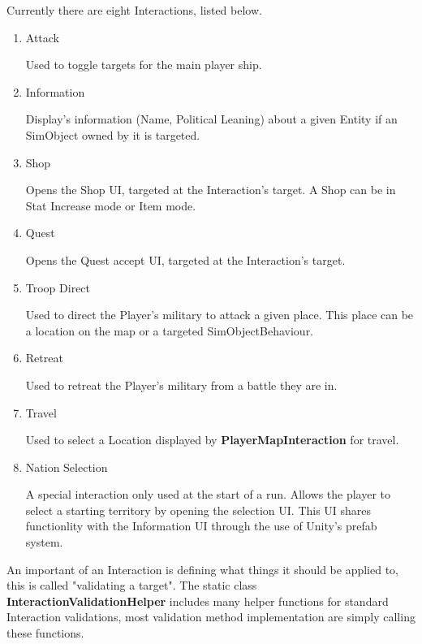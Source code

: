 \documentclass{report}
\begin{document}
Currently there are eight Interactions, listed below.

\begin{enumerate}

	\item Attack

	Used to toggle targets for the main player ship.

	\item Information
	
	Display's information (Name, Political Leaning) about a given Entity if an SimObject owned by it is targeted.

	\item Shop

	Opens the Shop UI, targeted at the Interaction's target. A Shop can be in Stat Increase mode or Item mode.

	\item Quest

	Opens the Quest accept UI,  targeted at the Interaction's target.

	\item Troop Direct

	Used to direct the Player's military to attack a given place. This place can be a location on the map or a targeted SimObjectBehaviour.

	\item Retreat
	
	Used to retreat the Player's military from a battle they are in.

	\item Travel

	Used to select a Location displayed by \textbf{PlayerMapInteraction} for travel.

	\item Nation Selection

	A special interaction only used at the start of a run. Allows the player to select a starting territory by opening the selection UI. This UI shares functionlity with the Information UI through the use of Unity's prefab system.

\end{enumerate}

An important of an Interaction is defining what things it should be applied to, this is called "validating a target". The static class \textbf{InteractionValidationHelper} includes many helper functions for standard Interaction validations, most validation method implementation are simply calling these functions. 
\end{document}
